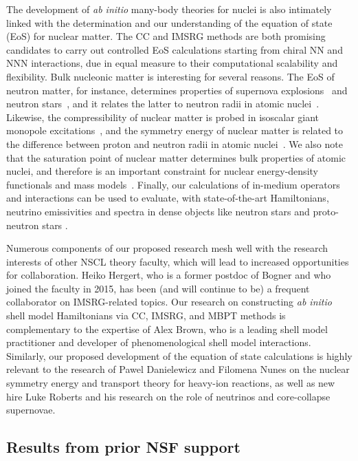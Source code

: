 The development of {\em ab initio} many-body theories for nuclei is also
intimately linked with the determination and our understanding of the
equation of state (EoS) for nuclear matter.  The CC and IMSRG methods are both promising 
candidates to carry out controlled EoS
calculations starting from chiral NN and NNN interactions, due in
equal measure to their computational scalability and flexibility. Bulk nucleonic matter is
interesting for several reasons. The EoS of neutron matter, for
instance, determines properties of supernova
explosions~\cite{Sumiyoshi:2005ri,Murphy:2009dx} and neutron
stars~\cite{Hebeler:2014ema, Lattimer:2000kb, Lattimer:2000nx},
and it relates the latter to neutron radii in atomic
nuclei~\cite{Brown:2000pd, Horowitz:2000xj}. Likewise, the compressibility of
nuclear matter is probed in isoscalar giant monopole
excitations~\cite{Shlomo:1993zz}, and the symmetry energy of nuclear
matter is related to the difference between proton and neutron radii
in atomic nuclei~\cite{Abrahamyan:2012gp,Reinhard:2013fpa}. We also
note that the saturation point of nuclear matter determines bulk
properties of atomic nuclei, and therefore is an important constraint
for nuclear energy-density functionals and mass models~\cite{Kortelainen:2011ft,Bertsch:2004us}.  Finally, our calculations of in-medium
operators and interactions can be used to evaluate, with state-of-the-art Hamiltonians,
neutrino emissivities and spectra in dense objects like neutron stars and proto-neutron stars \cite{Balasi:2015dba,Lohs:2015qyn}.

Numerous components of our proposed
research mesh well with the research interests of other NSCL theory
faculty, which will lead to increased opportunities for
collaboration. Heiko Hergert, who is a former postdoc of Bogner and
who joined the faculty in 2015, has been (and will continue to be) a
frequent collaborator on IMSRG-related topics. Our research on
constructing \emph{ab initio} shell model Hamiltonians via CC,
IMSRG, and MBPT methods is complementary to the expertise of Alex Brown, who is
a leading shell model practitioner and developer of phenomenological
shell model interactions. Similarly, our proposed development of the
equation of state calculations is highly relevant to the research of
Pawel Danielewicz and Filomena Nunes on the nuclear symmetry energy
and transport theory for heavy-ion reactions, as well as new hire Luke
Roberts and his research on the role of neutrinos and core-collapse supernovae.




\subsection{Results from prior NSF support}

